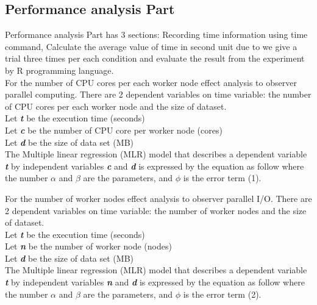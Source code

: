 \documentclass[conference]{IEEEtran}
\begin{document}
\subsection{Performance analysis Part}
Performance analysis Part has 3 sections: Recording time information using time command,  Calculate the average value of time in second unit due to we give a trial three times per each condition and evaluate the result from the experiment by R programming language.\\
\indent For the number of CPU cores per each worker node effect analysis to observer parallel computing. There are 2 dependent variables on time variable: the number of CPU cores per each worker node and the size of dataset.\\
\indent Let \textbf{\textit{t}} be the execution time (seconds)\\
\indent Let \textbf{\textit{c}} be the number of CPU core per worker node (cores)\\
\indent Let \textbf{\textit{d}} be the size of data set (MB)\\
\indent The Multiple linear regression (MLR) model that describes a dependent variable  \textbf{\textit{t}} by independent variables \textbf{\textit{c}} and  \textbf{\textit{d}} is expressed by the equation as follow where the number \begin{math}\alpha\end{math} and \begin{math}\beta\end{math} are the parameters, and \begin{math}\phi\end{math} is the error term (1).

\indent For the number of worker nodes effect analysis to observer parallel I/O. There are 2 dependent variables on time variable: the number of worker nodes and the size of dataset.\\
\indent Let \textbf{\textit{t}} be the execution time (seconds)\\
\indent Let \textbf{\textit{n}} be the number of worker node (nodes)\\
\indent Let \textbf{\textit{d}} be the size of data set (MB)\\
\indent The Multiple linear regression (MLR) model that describes a dependent variable  \textbf{\textit{t}} by independent variables \textbf{\textit{n}} and  \textbf{\textit{d}} is expressed by the equation as follow where the number \begin{math}\alpha\end{math} and \begin{math}\beta\end{math} are the parameters, and \begin{math}\phi\end{math} is the error term (2).
\end{document}
